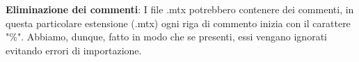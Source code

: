 \begin{itemize}
    \begin{item}
        \textbf{Eliminazione dei commenti}: I file .mtx potrebbero contenere dei commenti, in questa particolare estensione (.mtx) ogni riga di commento inizia con il carattere "\%". Abbiamo, dunque, fatto in modo che se presenti, essi vengano ignorati evitando errori di importazione.
    \end{item}

\end{itemize}